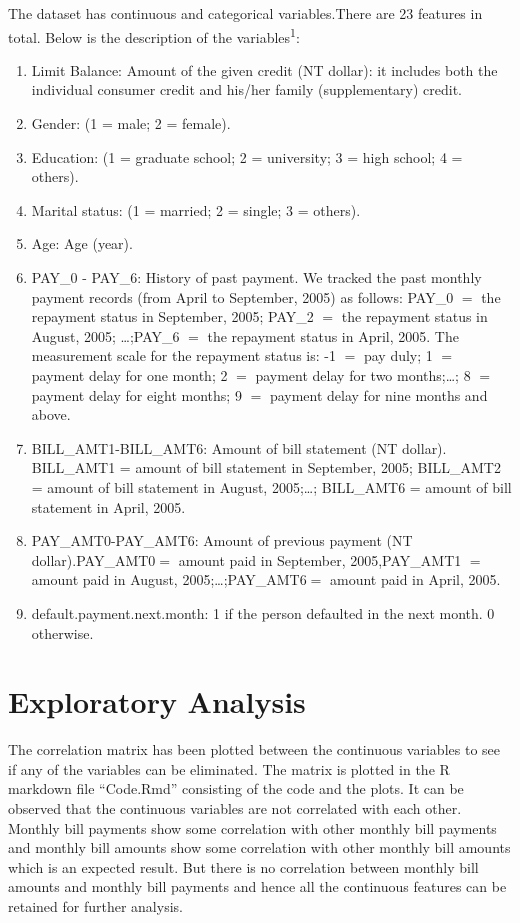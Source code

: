 \documentclass{article}
\begin{document}
 
The dataset has continuous and categorical variables.There are 23 features in total. Below is the description of the variables\textsuperscript{1}:
\begin{enumerate}[leftmargin=2cm,rightmargin=2cm]
\item Limit Balance: Amount of the given credit (NT dollar): it includes both the individual consumer credit and his/her family (supplementary) credit.
\item Gender: (1 = male; 2 = female).
\item Education:  (1 = graduate school; 2 = university; 3 = high school; 4 = others).
\item Marital status:  (1 = married; 2 = single; 3 = others). 
\item Age: Age (year).
\item PAY\_0 - PAY\_6:  History of past payment. We tracked the past monthly payment records (from April to September, 2005) as follows: PAY\_0 $=$ the repayment status in September, 2005; PAY\_2 $=$ the repayment status in August, 2005; \ldots;PAY\_6 $=$ the repayment status in April, 2005. The measurement scale for the repayment status is: -1 $=$ pay duly; 1 $=$ payment delay for one month; 2 $=$ payment delay for two months;\ldots; 8 $=$ payment delay for eight months; 9 $=$ payment delay for nine months and above.
\item BILL\_AMT1-BILL\_AMT6: Amount of bill statement (NT dollar). BILL\_AMT1 = amount of bill statement in September, 2005; BILL\_AMT2 = amount of bill statement in August, 2005;\ldots; BILL\_AMT6 = amount of bill statement in April, 2005.
 \item PAY\_AMT0-PAY\_AMT6: Amount of previous payment (NT dollar).PAY\_AMT0$=$ amount paid in September, 2005,PAY\_AMT1 $=$ amount paid in August, 2005;\ldots;PAY\_AMT6$=$ amount paid in April, 2005.
\item default.payment.next.month: 1 if the person defaulted in the next month. 0 otherwise.

\end{enumerate}

\section{Exploratory Analysis}

The correlation matrix has been plotted between the continuous variables to see if any of the variables can be eliminated. The matrix is plotted in the R markdown file “Code.Rmd”  consisting of the code and the plots. It can be observed that the  continuous variables are not correlated with each other.  Monthly bill payments show some correlation with other monthly bill payments and monthly bill amounts show some correlation with other monthly bill amounts which is an expected result. But there is no correlation between monthly bill amounts and monthly bill payments and hence all the continuous features can be retained for further analysis.
\end{document}
